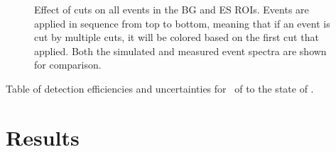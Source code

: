 \documentclass[/main.tex]{subfiles}
\begin{document}
\begin{figure}
  \centering
  \caption[Effect of data cuts on ROI events in measured and simulated data]{\label{fig:cutsroi}
    Effect of cuts on all events in the BG and ES ROIs. Events are applied in sequence from top to bottom, meaning that if an event is cut by multiple cuts, it will be colored based on the first cut that applied. Both the simulated and measured event spectra are shown for comparison.
  }
\end{figure}

\begin{table}
  \centering
  
  \caption[Detection efficiency summary for \tnbb\ to the  state of ]{\label{tab:bgcutstable}
    Table of detection efficiencies and uncertainties for \tnbb\ of  to the  state of .
  }
\end{table}

\section{Results}
\end{document}
